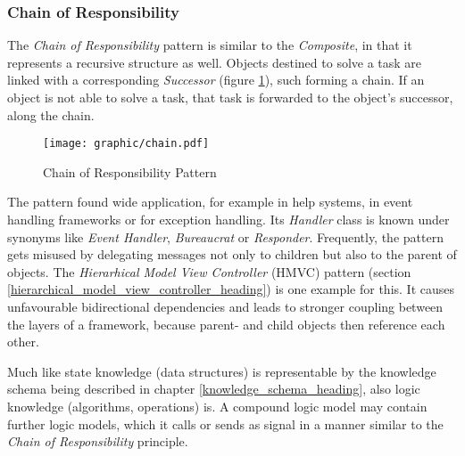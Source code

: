 %
%
%
%
%
%
%

\subsubsection{Chain of Responsibility}
\label{chain_of_responsibility_heading}

The \emph{Chain of Responsibility} pattern \cite{gamma1995} is similar to the
\emph{Composite}, in that it represents a recursive structure as well. Objects
destined to solve a task are linked with a corresponding \emph{Successor}
(figure \ref{chain_figure}), such forming a chain. If an object is not able to
solve a task, that task is forwarded to the object's successor, along the chain.

\begin{figure}[ht]
    \begin{center}
        \texttt{[image: graphic/chain.pdf]}
        \caption{Chain of Responsibility Pattern}
        \label{chain_figure}
    \end{center}
\end{figure}

The pattern found wide application, for example in help systems, in event
handling frameworks or for exception handling. Its \emph{Handler} class is
known under synonyms like \emph{Event Handler}, \emph{Bureaucrat} or
\emph{Responder}. Frequently, the pattern gets misused by delegating messages
not only to children but also to the parent of objects. The
\emph{Hierarhical Model View Controller} (HMVC) pattern (section
\ref{hierarchical_model_view_controller_heading}) is one example for this. It
causes unfavourable bidirectional dependencies and leads to stronger coupling
between the layers of a framework, because parent- and child objects then
reference each other.

Much like state knowledge (data structures) is representable by the knowledge
schema being described in chapter \ref{knowledge_schema_heading}, also logic
knowledge (algorithms, operations) is. A compound logic model may contain
further logic models, which it calls or sends as signal in a manner similar to
the \emph{Chain of Responsibility} principle.
